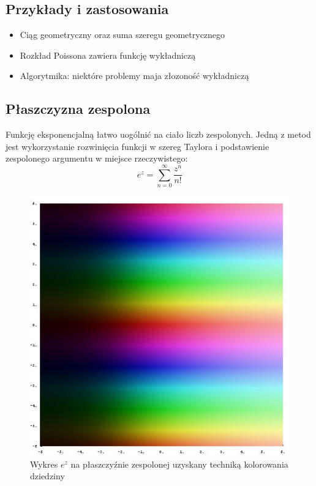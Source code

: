\documentclass[10pt,a4paper,onecolumn]{article}
\begin{document}
\subsection{Przykłady i zastosowania}
\begin{itemize}
\item Ciąg geometryczny oraz suma szeregu geometrycznego 
\item Rozkład Poissona zawiera funkcję wykładniczą
\item Algorytmika: niektóre problemy maja złozoność wykładniczą
\end{itemize}

\subsection{Płaszczyzna zespolona}
Funkcję eksponencjalną łatwo uogólnić na ciało liczb zespolonych. Jedną z metod jest wykorzystanie rozwinięcia funkcji w szereg Taylora i podstawienie zespolonego argumentu w miejsce rzeczywistego:
$$ e^z = \sum_{n=0}^\infty \frac{z^n}{n!}$$

\begin{figure}[hb]
\centering
\includegraphics[scale=0.15]{complex}
\caption{Wykres $e^z$ na płaszczyźnie zespolonej uzyskany techniką kolorowania dziedziny}
\end{figure}
\end{document}
